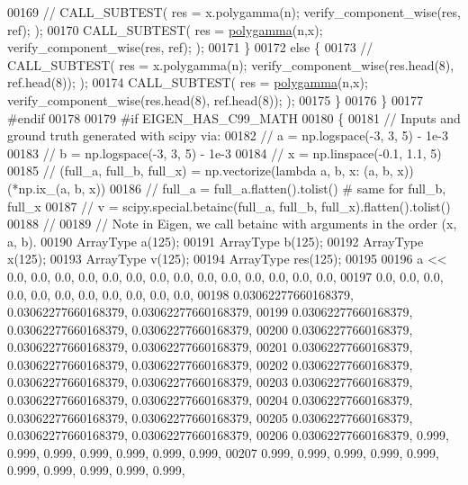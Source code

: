 \begin{DoxyCode}
00169       \textcolor{comment}{//       CALL\_SUBTEST( res = x.polygamma(n); verify\_component\_wise(res, ref); );}
00170       CALL\_SUBTEST( res = \hyperlink{namespace_eigen_ae3b47a13a0699f5dbaa0623c11333dca}{polygamma}(n,x);  verify\_component\_wise(res, ref); );
00171     \}
00172     \textcolor{keywordflow}{else} \{
00173       \textcolor{comment}{//       CALL\_SUBTEST( res = x.polygamma(n); verify\_component\_wise(res.head(8), ref.head(8)); );}
00174       CALL\_SUBTEST( res = \hyperlink{namespace_eigen_ae3b47a13a0699f5dbaa0623c11333dca}{polygamma}(n,x); verify\_component\_wise(res.head(8), ref.head(8)); );
00175     \}
00176   \}
00177 \textcolor{preprocessor}{#endif}
00178 
00179 \textcolor{preprocessor}{#if EIGEN\_HAS\_C99\_MATH}
00180   \{
00181     \textcolor{comment}{// Inputs and ground truth generated with scipy via:}
00182     \textcolor{comment}{//   a = np.logspace(-3, 3, 5) - 1e-3}
00183     \textcolor{comment}{//   b = np.logspace(-3, 3, 5) - 1e-3}
00184     \textcolor{comment}{//   x = np.linspace(-0.1, 1.1, 5)}
00185     \textcolor{comment}{//   (full\_a, full\_b, full\_x) = np.vectorize(lambda a, b, x: (a, b, x))(*np.ix\_(a, b, x))}
00186     \textcolor{comment}{//   full\_a = full\_a.flatten().tolist()  # same for full\_b, full\_x}
00187     \textcolor{comment}{//   v = scipy.special.betainc(full\_a, full\_b, full\_x).flatten().tolist()}
00188     \textcolor{comment}{//}
00189     \textcolor{comment}{// Note in Eigen, we call betainc with arguments in the order (x, a, b).}
00190     ArrayType a(125);
00191     ArrayType b(125);
00192     ArrayType x(125);
00193     ArrayType v(125);
00194     ArrayType res(125);
00195 
00196     a << 0.0, 0.0, 0.0, 0.0, 0.0, 0.0, 0.0, 0.0, 0.0, 0.0, 0.0, 0.0, 0.0, 0.0,
00197         0.0, 0.0, 0.0, 0.0, 0.0, 0.0, 0.0, 0.0, 0.0, 0.0, 0.0,
00198         0.03062277660168379, 0.03062277660168379, 0.03062277660168379,
00199         0.03062277660168379, 0.03062277660168379, 0.03062277660168379,
00200         0.03062277660168379, 0.03062277660168379, 0.03062277660168379,
00201         0.03062277660168379, 0.03062277660168379, 0.03062277660168379,
00202         0.03062277660168379, 0.03062277660168379, 0.03062277660168379,
00203         0.03062277660168379, 0.03062277660168379, 0.03062277660168379,
00204         0.03062277660168379, 0.03062277660168379, 0.03062277660168379,
00205         0.03062277660168379, 0.03062277660168379, 0.03062277660168379,
00206         0.03062277660168379, 0.999, 0.999, 0.999, 0.999, 0.999, 0.999, 0.999,
00207         0.999, 0.999, 0.999, 0.999, 0.999, 0.999, 0.999, 0.999, 0.999, 0.999,

\end{DoxyCode}
